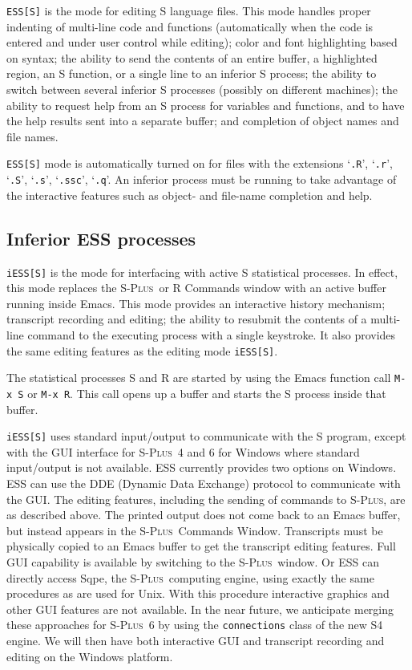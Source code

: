 \documentclass{article}
\newcommand*{\Splus}{\textsc{S-Plus}}
\newcommand{\stexttt}[1]{{\small\texttt{#1}}}
\newcommand{\file}[1]{`\stexttt{#1}'}
\begin{document}
\stexttt{ESS[S]} is the mode for editing S language files.  This mode
handles proper indenting of multi-line code and functions
(automatically when the code is entered and under user
control while editing); color and font highlighting based on syntax; the
ability to send the contents of an entire buffer, a highlighted
region, an S function, or a single line to an inferior S process; the
ability to switch between several inferior S processes (possibly on
different machines); the ability to request help from an S process for
variables and functions, and to have the help results sent into a
separate buffer; and completion of object names and file names.

\stexttt{ESS[S]} mode is automatically turned on for files with the
extensions \file{.R}, \file{.r},
\file{.S}, \file{.s}, \file{.ssc}, \file{.q}.  An inferior
process must be running to take advantage of the interactive features
such as object- and file-name completion and help.

\subsection{Inferior ESS processes}
\label{sec:S:inf}

\stexttt{iESS[S]} is the mode for interfacing with active S
statistical processes.  In effect, this mode replaces the \Splus\ or R
Commands window with an active buffer running inside Emacs.  This mode
provides an interactive history mechanism; transcript recording and
editing; the ability to resubmit the contents of a multi-line command
to the executing process with a single keystroke.  It also provides
the same editing features as the editing mode \stexttt{iESS[S]}.

The statistical processes S and R are started by using the Emacs
function call \stexttt{M-x~S} or \stexttt{M-x~R}.  This call opens up
a buffer and starts the S process inside that buffer.

\stexttt{iESS[S]} uses standard input/output to communicate with the S
program, except with the GUI interface for \Splus\ 4 and 6 for Windows
where standard input/output is not available.
ESS currently provides two options on Windows.  ESS
can use the DDE (Dynamic Data Exchange) protocol
to communicate with the GUI.  The
editing features, including the sending of commands to \Splus, are as
described above.  The printed output does not come back to an Emacs
buffer, but instead appears in the \Splus\ Commands Window.
Transcripts must be physically copied to an Emacs buffer to get the
transcript editing features.   Full GUI
capability is available by switching to the \Splus\ window.
Or ESS can directly access Sqpe, the
\Splus\ computing engine, using exactly the same procedures as are
used for Unix.  With this procedure interactive graphics and other GUI
features are not available.  In the near future, we
anticipate merging these approaches for  \Splus\ 6 by
using the \stexttt{connections} class of the new S4 engine.  We will then
have both interactive GUI and transcript recording and
editing on the Windows platform.
\end{document}
